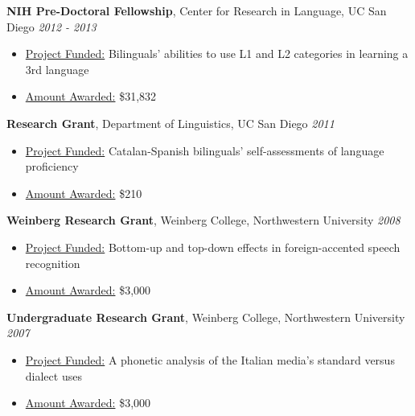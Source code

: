 \documentclass[9pt]{article}
\newenvironment{changemargin}[2]{%
  \begin{list}{}{%
    \setlength{\topsep}{0pt}%
    \setlength{\leftmargin}{#1}%
    \setlength{\rightmargin}{#2}%
    \setlength{\listparindent}{\parindent}%
    \setlength{\itemindent}{\parindent}%
    \setlength{\parsep}{\parskip}%
  }%
  \item[]}{\end{list}
}
\newenvironment{body} {
	\vspace*{-16pt}
	\begin{changemargin}{-0.25in}{-0.5in}
  }	
	{\end{changemargin}
}
\begin{document}
\begin{body}
	\textbf{NIH Pre-Doctoral Fellowship}, Center for Research in Language, UC San Diego \hfill {} \emph{2012 - 2013}\\
	\vspace{-4pt}
	\begin{itemize}
		\item[]\underline{Project Funded:} Bilinguals' abilities to use L1 and L2 categories in learning a 3rd language\\
		\item[]\underline{Amount Awarded:} \$31,832\\
	\end{itemize}
	\vspace{-4pt}
	\medskip
	
	\textbf{Research Grant}, Department of Linguistics, UC San Diego \hfill {} \emph{2011}\\
	\vspace{-4pt}
	\begin{itemize}
		\item[]\underline{Project Funded:} Catalan-Spanish bilinguals' self-assessments of language proficiency\\
		\item[]\underline{Amount Awarded:} \$210\\
	\end{itemize}
	\vspace{-4pt}
	\medskip
	
	\textbf{Weinberg Research Grant}, Weinberg College, Northwestern University \hfill {} \emph{2008}\\
	\vspace{-4pt}
	\begin{itemize}
		\item[]\underline{Project Funded:} Bottom-up and top-down effects in foreign-accented speech recognition\\
		\item[]\underline{Amount Awarded:} \$3,000\\
	\end{itemize}
	\vspace{-4pt}
	\medskip
	
	\textbf{Undergraduate Research Grant}, Weinberg College, Northwestern University \hfill {} \emph{2007}\\
	\vspace{-4pt}
	\begin{itemize}
		\item[]\underline{Project Funded:} A phonetic analysis of the Italian media's standard versus dialect uses\\
		\item[]\underline{Amount Awarded:} \$3,000\\
	\end{itemize}
	\vspace{-4pt}
	\medskip
		
\end{body}
\end{document}
